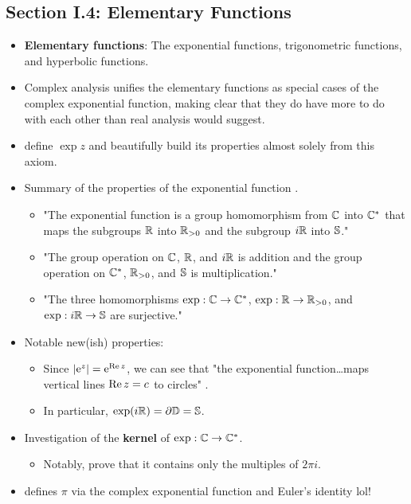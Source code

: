 \documentclass[../notes.tex]{subfiles}
\begin{document}
\subsection*{Section I.4: Elementary Functions}
\begin{itemize}
    \item \textbf{Elementary functions}: The exponential functions, trigonometric functions, and hyperbolic functions.
    \item Complex analysis unifies the elementary functions as special cases of the complex exponential function, making clear that they do have more to do with each other than real analysis would suggest.
    \item \textcite{bib:FischerLieb} define $\exp z$ and beautifully build its properties almost solely from this axiom.
    \item Summary of the properties of the exponential function \parencite[20]{bib:FischerLieb}.
    \begin{itemize}
        \item "The exponential function is a group homomorphism from $\C$ into $\C^*$ that maps the subgroups $\R$ into $\R_{>0}$ and the subgroup $i\R$ into $\Ss$."
        \item "The group operation on $\C$, $\R$, and $i\R$ is addition and the group operation on $\C^*$, $\R_{>0}$, and $\Ss$ is multiplication."
        \item "The three homomorphisms $\exp:\C\to\C^*$, $\exp:\R\to\R_{>0}$, and $\exp:i\R\to\Ss$ are surjective."
    \end{itemize}
    \item Notable new(ish) properties:
    \begin{itemize}
        \item Since $|\e[z]|=\e[\re z]$, we can see that "the exponential function\dots maps vertical lines $\re z=c$ to circles" \parencite[20]{bib:FischerLieb}.
        \item In particular, $\exp(i\R)=\partial\D=\Ss$.
    \end{itemize}
    \item Investigation of the \textbf{kernel} of $\exp:\C\to\C^*$.
    \begin{itemize}
        \item Notably, \textcite{bib:FischerLieb} prove that it contains only the multiples of $2\pi i$.
    \end{itemize}
    \item \textcite{bib:FischerLieb} defines $\pi$ via the complex exponential function and Euler's identity lol!

\end{itemize}
\end{document}
